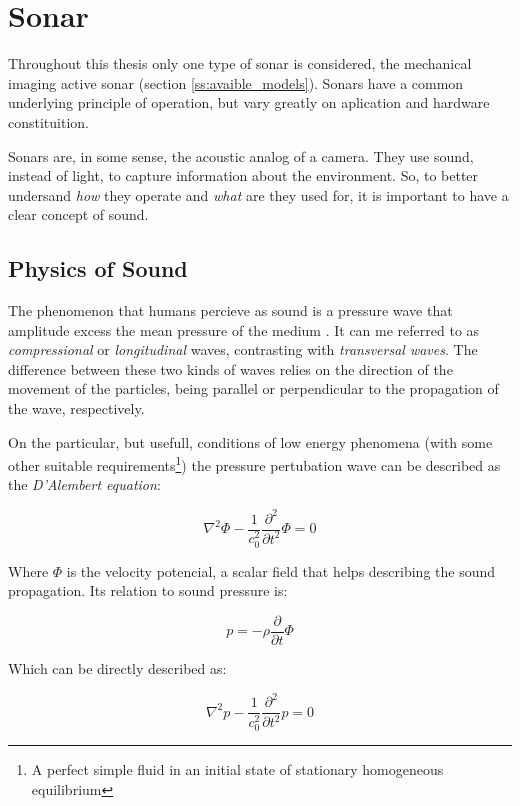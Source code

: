 \section{Sonar}

Throughout this thesis only one type of sonar is considered, the mechanical
imaging active sonar (section \ref{ss:avaible_models}). Sonars have a common
underlying principle of operation, but vary greatly on aplication and hardware constituition.

Sonars are, in some sense, the acoustic analog of a camera. They use sound,
instead of light, to capture information about the environment. So, to better
undersand \textit{how} they operate and \textit{what} are they used for, it is
important to have a clear concept of sound.

\subsection{Physics of Sound}

The phenomenon that humans percieve as sound is a pressure wave that amplitude
excess the mean pressure of the medium \cite{FEYNMAN}. It can me referred to as
\textit{compressional} or \textit{longitudinal} waves, contrasting with
\textit{transversal waves}. The difference between these two kinds of waves
relies on the direction of the movement of the particles, being parallel or
perpendicular to the propagation of the wave, respectively\cite{BRUNEAU}.

On the particular, but usefull, conditions of low energy
phenomena\cite{Lefebvre} (with some other suitable requirements\footnote{A
perfect simple fluid in an initial state of stationary homogeneous equilibrium})
the pressure pertubation wave can be described as the \textit{D'Alembert
equation}:
 
\begin{equation}\label{eq:lambert}
\nabla^2 \Phi - \frac{1}{c^2_0}\frac{\partial^2}{\partial t^2} \Phi = 0
\end{equation}

Where $\Phi$ is the velocity potencial, a scalar field that helps describing the
sound propagation. Its relation to sound pressure is:

\[ p =  -\rho \frac{\partial}{\partial t}\Phi \]

Which can be directly described as:

\begin{equation} \label{eq:wave}
\nabla^2 p - \frac{1}{c^2_0}\frac{\partial^2}{\partial t^2} p = 0
\end{equation} 
 
